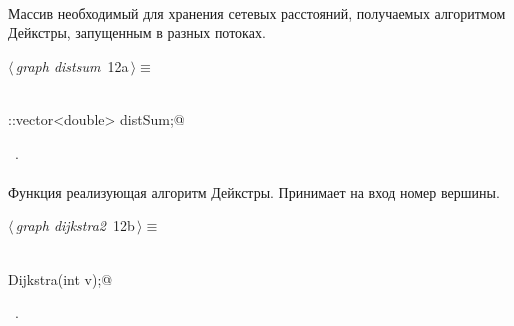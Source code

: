 \documentclass[12pt]{article}
\begin{document}
\paragraph{}
Массив необходимый для хранения сетевых расстояний, получаемых алгоритмом Дейкстры, запущенным в разных потоках. 
\begin{flushleft} \small
\begin{minipage}{\linewidth}\label{scrap16}\raggedright\small
{} $\langle\,${\itshape graph distsum}\nobreak\ {\footnotesize {12a}}$\,\rangle\equiv$
\vspace{-1ex}
\begin{list}{}{} \item
\mbox{}\verb@@\\
\mbox{}\verb@std::vector<double> distSum;@\\
\mbox{}\verb@@{\NWsep}
\end{list}
\vspace{-1.5ex}
\footnotesize
\begin{list}{}{\setlength{\itemsep}{-\parsep}\setlength{\itemindent}{-\leftmargin}}
\item \NWtxtMacroRefIn\ .

\item{}
\end{list}
\end{minipage}\vspace{4ex}
\end{flushleft}
\paragraph{}
Функция реализующая алгоритм Дейкстры. Принимает на вход номер вершины.
\begin{flushleft} \small
\begin{minipage}{\linewidth}\label{scrap17}\raggedright\small
{} $\langle\,${\itshape graph dijkstra2}\nobreak\ {\footnotesize {12b}}$\,\rangle\equiv$
\vspace{-1ex}
\begin{list}{}{} \item
\mbox{}\verb@@\\
\mbox{}\verb@double Dijkstra(int v);@\\
\mbox{}\verb@@{\NWsep}
\end{list}
\vspace{-1.5ex}
\footnotesize
\begin{list}{}{\setlength{\itemsep}{-\parsep}\setlength{\itemindent}{-\leftmargin}}
\item \NWtxtMacroRefIn\ .

\item{}
\end{list}
\end{minipage}\vspace{4ex}
\end{flushleft}
\end{document}
